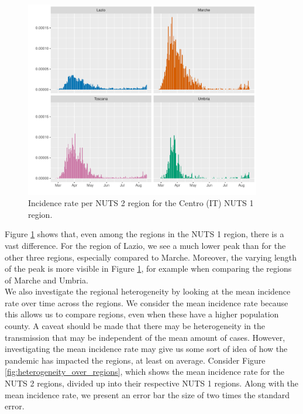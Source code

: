 \documentclass[12pt]{article}
\begin{document}
	\begin{figure}[H]
	    \centering
	    \includegraphics[width=0.92\textwidth]{output/infective_rates_Centro (IT).pdf}
	    \caption{Incidence rate per NUTS 2 region for the Centro (IT) NUTS 1 region.}
	    \label{fig:incidence_Centro}
	\end{figure}
	
	Figure \ref{fig:incidence_Centro} shows that, even among the regions in the NUTS 1 region, there is a vast difference. For the region of Lazio, we see a much lower peak than for the other three regions, especially compared to Marche. Moreover, the varying length of the peak is more visible in Figure \ref{fig:incidence_Centro}, for example when comparing the regions of Marche and Umbria. \\
	
	We also investigate the regional heterogeneity by looking at the mean incidence rate over time across the regions. We consider the mean incidence rate because this allows us to compare regions, even when these have a higher population county. A caveat should be made that there may be heterogeneity in the transmission that may be independent of the mean amount of cases. However, investigating the mean incidence rate may give us some sort of idea of how the pandemic has impacted the regions, at least on average. Consider Figure \ref{fig:heterogeneity_over_regions}, which shows the mean incidence rate for the NUTS 2 regions, divided up into their respective NUTS 1 regions. Along with the mean incidence rate, we present an error bar the size of two times the standard error.
	
\end{document}
